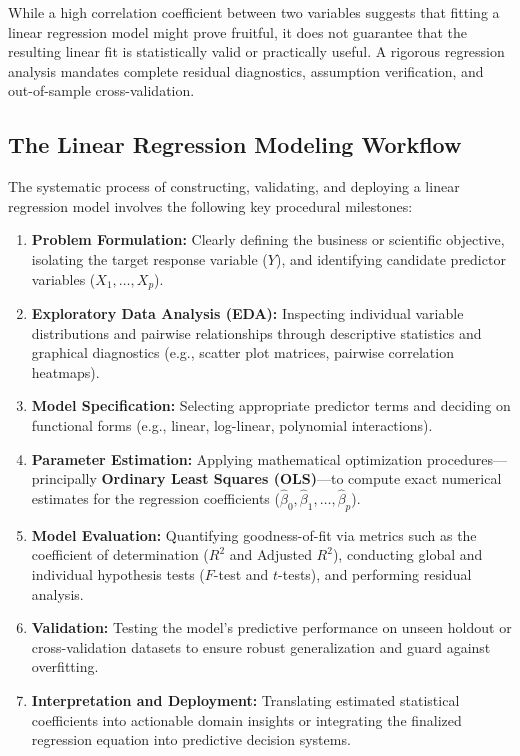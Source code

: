 \begin{observacion}
	While a high correlation coefficient between two variables suggests that fitting a linear regression model might prove fruitful, it does not guarantee that the resulting linear fit is statistically valid or practically useful. A rigorous regression analysis mandates complete residual diagnostics, assumption verification, and out-of-sample cross-validation.
\end{observacion}

\subsection{The Linear Regression Modeling Workflow}

The systematic process of constructing, validating, and deploying a linear regression model involves the following key procedural milestones:

\begin{enumerate}
	\item \textbf{Problem Formulation:} Clearly defining the business or scientific objective, isolating the target response variable ($Y$), and identifying candidate predictor variables ($X_1, \dots, X_p$).
	\item \textbf{Exploratory Data Analysis (EDA):} Inspecting individual variable distributions and pairwise relationships through descriptive statistics and graphical diagnostics (e.g., scatter plot matrices, pairwise correlation heatmaps).
	\item \textbf{Model Specification:} Selecting appropriate predictor terms and deciding on functional forms (e.g., linear, log-linear, polynomial interactions).
	\item \textbf{Parameter Estimation:} Applying mathematical optimization procedures—principally \textbf{Ordinary Least Squares (OLS)}—to compute exact numerical estimates for the regression coefficients ($\hat{\beta}_0, \hat{\beta}_1, \dots, \hat{\beta}_p$).
	\item \textbf{Model Evaluation:} Quantifying goodness-of-fit via metrics such as the coefficient of determination ($R^2$ and Adjusted $R^2$), conducting global and individual hypothesis tests ($F$-test and $t$-tests), and performing residual analysis.
	\item \textbf{Validation:} Testing the model's predictive performance on unseen holdout or cross-validation datasets to ensure robust generalization and guard against overfitting.
	\item \textbf{Interpretation and Deployment:} Translating estimated statistical coefficients into actionable domain insights or integrating the finalized regression equation into predictive decision systems.
\end{enumerate}

